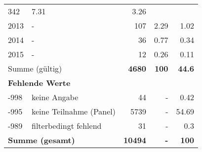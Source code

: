 \begin{longtable}{lXrrr}
       \num{342} &
       \num[round-mode=places,round-precision=2]{7.31} &
         \num[round-mode=places,round-precision=2]{3.26} \\

     2013 &
     \multicolumn{1}{X}{ -  } &


       \num{107} &
       \num[round-mode=places,round-precision=2]{2.29} &
         \num[round-mode=places,round-precision=2]{1.02} \\

     2014 &
     \multicolumn{1}{X}{ -  } &


       \num{36} &
       \num[round-mode=places,round-precision=2]{0.77} &
         \num[round-mode=places,round-precision=2]{0.34} \\

     2015 &
     \multicolumn{1}{X}{ -  } &


       \num{12} &
       \num[round-mode=places,round-precision=2]{0.26} &
         \num[round-mode=places,round-precision=2]{0.11} \\
     \midrule
     \multicolumn{2}{l}{Summe (gültig)} &
       \textbf{\num{4680}} &
     \textbf{\num{100}} &
       \textbf{\num[round-mode=places,round-precision=2]{44.6}} \\
     \multicolumn{5}{l}{\textbf{Fehlende Werte}}\\
       -998 &
       keine Angabe &
         \num{44} &
        - &
         \num[round-mode=places,round-precision=2]{0.42} \\
       -995 &
       keine Teilnahme (Panel) &
         \num{5739} &
        - &
         \num[round-mode=places,round-precision=2]{54.69} \\
       -989 &
       filterbedingt fehlend &
         \num{31} &
        - &
         \num[round-mode=places,round-precision=2]{0.3} \\
     \midrule
     \multicolumn{2}{l}{\textbf{Summe (gesamt)}} &
          \textbf{\num{10494}} &
        \textbf{-} &
        \textbf{\num{100}} \\
     \bottomrule
     \end{longtable}
     
